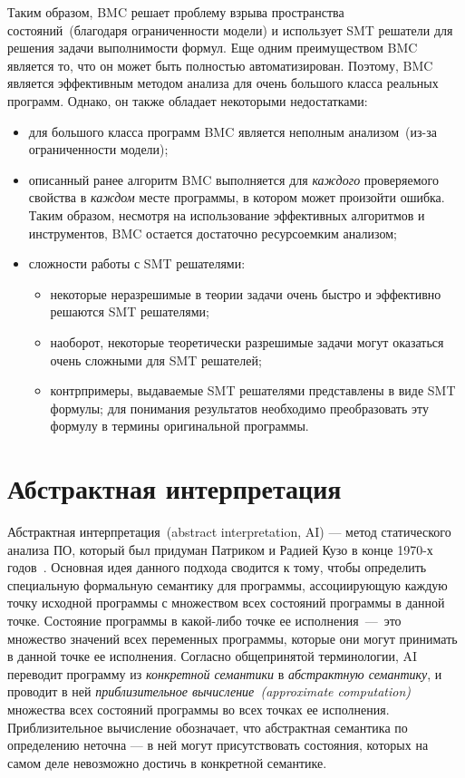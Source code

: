 Таким образом, BMC решает проблему взрыва пространства состояний~(благодаря 
ограниченности модели) и использует SMT решатели для решения задачи 
выполнимости формул. Еще одним преимуществом BMC является то, что он может быть
полностью автоматизирован. Поэтому, BMC является эффективным методом анализа для 
очень большого класса реальных программ. Однако, он также обладает некоторыми 
недостатками:
\begin{itemize}
\item для большого класса программ BMC является неполным анализом~(из-за 
ограниченности модели);

\item описанный ранее алгоритм BMC выполняется для \emph{каждого} 
проверяемого свойства в \emph{каждом} месте программы, в котором может 
произойти ошибка. Таким образом, несмотря на использование эффективных 
алгоритмов и инструментов, BMC остается достаточно ресурсоемким анализом;

\item сложности работы с SMT решателями:
	\begin{itemize}
	\item некоторые неразрешимые в теории задачи очень быстро и эффективно 
	решаются SMT решателями;
	\item наоборот, некоторые теоретически разрешимые задачи могут оказаться
	очень сложными для SMT решателей;
	\item контрпримеры, выдаваемые SMT решателями представлены в виде 
	SMT формулы; для понимания результатов необходимо преобразовать эту формулу
	в термины оригинальной программы.
	\end{itemize}
\end{itemize}

\section{Абстрактная интерпретация}
Абстрактная интерпретация~(abstract interpretation, AI) --- метод 
статического анализа ПО, который был придуман Патриком и Радией Кузо в конце 
1970-х годов~\cite{ai}. Основная идея данного подхода сводится к тому, чтобы 
определить специальную формальную семантику для программы, ассоциирующую 
каждую точку исходной программы с множеством всех состояний программы в данной 
точке. Состояние программы в какой-либо точке ее исполнения~---~это множество 
значений всех переменных программы, которые они могут принимать в данной точке 
ее исполнения. Согласно общепринятой терминологии, AI переводит программу из 
\emph{конкретной семантики} в \emph{абстрактную семантику}, и проводит в ней 
\emph{приблизительное вычисление~(approximate computation)} множества всех
состояний программы во всех точках ее исполнения. Приблизительное вычисление 
обозначает, что абстрактная семантика по определению неточна --- в ней могут 
присутствовать состояния, которых на самом деле невозможно достичь в 
конкретной семантике.

